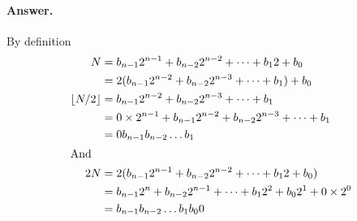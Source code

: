 \paragraph{Answer.} By definition
\begin{align*}
N &= b_{n-1} 2^{n-1} + b_{n-2} 2^{n-2} + \dots + b_1 2 + b_0\\
  &= 2 (b_{n-1} 2^{n-2} + b_{n-2} 2^{n-3} + \dots + b_1) + b_0\\
\lfloor{}N/2\rfloor 
  &= b_{n-1} 2^{n-2} + b_{n-2} 2^{n-3} + \dots + b_1\\
  &= 0 \times 2^{n-1} + b_{n-1} 2^{n-2} + b_{n-2} 2^{n-3} + \dots + b_1\\
  &= 0 b_{n-1} b_{n-2} \dots b_1\\
\intertext{And}
2N &= 2(b_{n-1} 2^{n-1} + b_{n-2} 2^{n-2} + \dots + b_1 2 + b_0)\\
   &= b_{n-1} 2^{n} + b_{n-2} 2^{n-1} + \dots + b_1 2^2 + b_0 2^1 
      + 0 \times 2^0\\
   &= b_{n-1} b_{n-2} \dots b_1 b_0 0
\end{align*}

